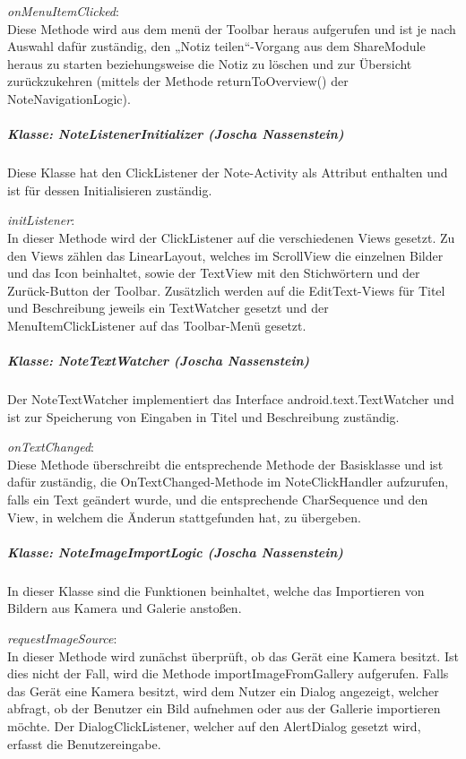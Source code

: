 \textit{onMenuItemClicked}:\\
Diese Methode wird aus dem menü der Toolbar heraus aufgerufen und ist je nach Auswahl dafür zuständig, den „Notiz teilen“-Vorgang aus dem ShareModule heraus zu starten beziehungsweise die Notiz zu löschen und zur Übersicht zurückzukehren (mittels der Methode returnToOverview() der NoteNavigationLogic).

\subparagraph{Klasse: NoteListenerInitializer (Joscha Nassenstein)}
Diese Klasse hat den ClickListener der Note-Activity als Attribut enthalten und ist für dessen Initialisieren zuständig.

\textit{initListener}:\\
In dieser Methode wird der ClickListener auf die verschiedenen Views gesetzt. Zu den Views zählen das LinearLayout, welches im ScrollView die einzelnen Bilder und das Icon beinhaltet, sowie der TextView mit den Stichwörtern und der Zurück-Button der Toolbar. Zusätzlich werden auf die EditText-Views für Titel und Beschreibung jeweils ein TextWatcher gesetzt und der MenuItemClickListener auf das Toolbar-Menü gesetzt.

\subparagraph{Klasse: NoteTextWatcher (Joscha Nassenstein)}
Der NoteTextWatcher implementiert das Interface android.text.TextWatcher und ist zur Speicherung von Eingaben in Titel und Beschreibung zuständig.

\textit{onTextChanged}:\\
Diese Methode überschreibt die entsprechende Methode der Basisklasse und ist dafür zuständig, die OnTextChanged-Methode im NoteClickHandler aufzurufen, falls ein Text geändert wurde, und die entsprechende CharSequence und den View, in welchem die Änderun stattgefunden hat, zu übergeben.

\subparagraph{Klasse: NoteImageImportLogic (Joscha Nassenstein)}
In dieser Klasse sind die Funktionen beinhaltet, welche das Importieren von Bildern aus Kamera und Galerie anstoßen.

\textit{requestImageSource}:\\
In dieser Methode wird zunächst überprüft, ob das Gerät eine Kamera besitzt. Ist dies nicht der Fall, wird die Methode importImageFromGallery aufgerufen. Falls das Gerät eine Kamera besitzt, wird dem Nutzer ein Dialog angezeigt, welcher abfragt, ob der Benutzer ein Bild aufnehmen oder aus der Gallerie importieren möchte. Der DialogClickListener, welcher auf den AlertDialog gesetzt wird, erfasst die Benutzereingabe.

